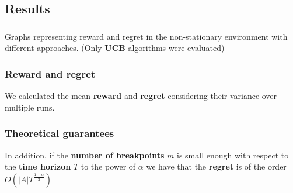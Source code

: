 \subsection{Results}


\begin{frame}
\frametitle{}
\framesubtitle{}


\scriptsize Graphs representing reward and regret in the non-stationary environment with different approaches. (Only \textbf{UCB} algorithms were evaluated)

\end{frame}


\begin{frame}
\frametitle{Reward and regret}

We calculated the mean \textbf{reward} and \textbf{regret} considering their variance over multiple runs.


\end{frame}


\begin{frame}
\frametitle{Theoretical guarantees}

In addition, if the \textbf{number of breakpoints} $m$ is small enough with respect to the \textbf{time horizon} $T$ to the power of $\alpha$ we have that the \textbf{regret} is of the order $O\left( \vert A \vert T^{\frac{1+\alpha}{2}} \right)$

\end{frame}

